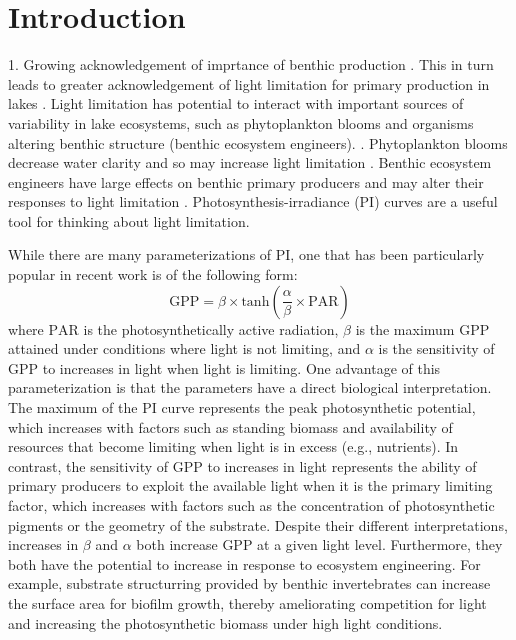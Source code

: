 \section*{Introduction}

1. Growing acknowledgement of imprtance of benthic production 
\citep{vadeboncoeur2002}
\linebreak 
{}. This in turn leads to greater acknowledgement of light limitation for primary production
in lakes
\citep{vadeboncoeur2003, karlsson2009}
\linebreak 
{}. Light limitation has potential to interact with important sources of variability in lake
ecosystems, such as phytoplankton blooms and organisms altering benthic structure
(benthic ecosystem engineers).
\linebreak 
{}. Phytoplankton blooms decrease water clarity and so may increase light limitation
\citep{scheffer2003}
\linebreak 
{}. Benthic ecosystem engineers have large effects on benthic primary producers
and may alter their responses to light limitation
\citep{phillips2019}
\linebreak 
{}. Photosynthesis-irradiance (PI) curves are a useful tool for thinking about light 
limitation.
\citep{jassby1976}
\linebreak 
\linebreak 

While there are many parameterizations of PI, 
one that has been particularly popular in recent work is of the following form:
%
\begin{equation} \label{eq:pi}
  \text{GPP} = 
    \beta \times \text{tanh}\left(\frac{\alpha} {\beta} \times \text{PAR}\right)
\end{equation}
%
where $\text{PAR}$ is the photosynthetically active radiation,
$\beta$ is the maximum GPP attained under conditions where light is not limiting,
and $\alpha$ is the sensitivity of GPP to increases in light when light is limiting.
One advantage of this parameterization is that the parameters have a direct 
biological interpretation. 
The maximum of the PI curve represents the peak photosynthetic potential,
which increases with factors such as standing biomass and
availability of resources that become limiting when light is in excess (e.g., nutrients).
In contrast, the sensitivity of GPP to increases in light represents the ability 
of primary producers to exploit the available light when it is the primary limiting factor,
which increases with factors such as the concentration of photosynthetic pigments or the 
geometry of the substrate.
Despite their different interpretations, increases in $\beta$ and $\alpha$ both increase
GPP at a given light level.
Furthermore, they both have the potential to increase in response to 
ecosystem engineering.
For example, substrate structurring provided by benthic invertebrates can increase
the surface area for biofilm growth, 
thereby ameliorating competition for light and increasing the photosynthetic 
biomass under high light conditions.

